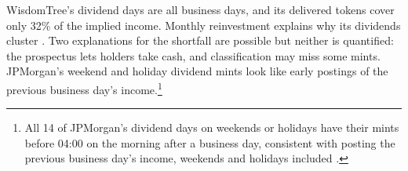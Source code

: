 \documentclass[12pt,a4paper]{article}
\begin{document}
WisdomTree's dividend days are all business days, and its delivered tokens cover only 32\% of the implied income. Monthly reinvestment explains why its dividends cluster \citep[p.~144]{WisdomTreeTMMDF2025}. Two explanations for the shortfall are possible but neither is quantified: the prospectus lets holders take cash, and classification may miss some mints. JPMorgan's weekend and holiday dividend mints look like early postings of the previous business day's income.\footnote{All 14 of JPMorgan's dividend days on weekends or holidays have their mints before 04:00 on the morning after a business day, consistent with posting the previous business day's income, weekends and holidays included \citep[p.~28]{JPMorganOnChainLTMMF2026}.}
\end{document}
